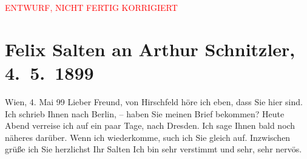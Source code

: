 
\begin{center}
            \textcolor{red}{ENTWURF, NICHT FERTIG KORRIGIERT}
                      \end{center}
            
         
         \renewcommand{\erwaehntePersonen}{Personen: Georg Hirschfeld}
         \renewcommand{\erwaehnteOrte}{Orte: Berlin, Dresden, Wien}
         \renewcommand{\erwaehnteWerke}{}
               \section[Felix Salten an Arthur Schnitzler, 4. 5. 1899]{ Felix Salten an Arthur Schnitzler, 4. 5. 1899}\nopagebreak{}\rehead{ }\begin{ledgroupsized}[t]{13cm}\normalsize\beginnumbering \toendnotes[C]{\smallbreak\pagebreak[2]} 
\pstart
           \raggedleft{}{\pb} Wien, 4. Mai 99\pend
           \pstart
           Lieber Freund, von Hirschfeld höre ich
               eben, dass Sie hier sind. Ich schrieb Ihnen nach Berlin, – haben Sie meinen Brief bekommen? Heute Abend verreise
               ich auf ein paar Tage, nach Dresden. Ich sage Ihnen bald
               noch näheres darüber. Wenn ich wiederkomme, such ich Sie gleich auf. Inzwischen grüße
               ich Sie herzlichst \pend
           \pstart  Ihr \spacefill\mbox{Salten}\pend{}\pstart
           \noindent{}Ich bin sehr verstimmt und sehr, sehr nervös.\pend
           
         
         \endnumbering{}\end{ledgroupsized}\begin{anhang}\end{anhang}\newcommand{\dateiname}{L03290}\newcommand{\titel}{Felix Salten an Arthur Schnitzler, 4. 5. 1899}\newcommand{\editorInnen}{Martin Anton Müller und Laura Untner}
      